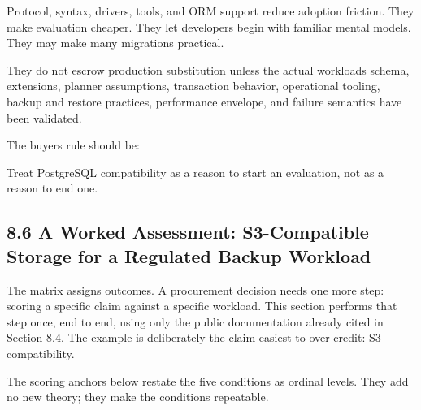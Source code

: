 \documentclass[11pt]{article}
\begin{document}
Protocol, syntax, drivers, tools, and ORM support reduce adoption friction. They make evaluation cheaper. They let developers begin with familiar mental models. They may make many migrations practical.

They do not escrow production substitution unless the actual workload\textquotesingle s schema, extensions, planner assumptions, transaction behavior, operational tooling, backup and restore practices, performance envelope, and failure semantics have been validated.

The buyer\textquotesingle s rule should be:

Treat PostgreSQL compatibility as a reason to start an evaluation, not as a reason to end one.

\subsection{8.6 A Worked Assessment: S3-Compatible Storage for a Regulated Backup Workload}\label{a-worked-assessment-s3-compatible-storage-for-a-regulated-backup-workload}

The matrix assigns outcomes. A procurement decision needs one more step: scoring a specific claim against a specific workload. This section performs that step once, end to end, using only the public documentation already cited in Section 8.4. The example is deliberately the claim easiest to over-credit: S3 compatibility.

The scoring anchors below restate the five conditions as ordinal levels. They add no new theory; they make the conditions repeatable.
\end{document}
